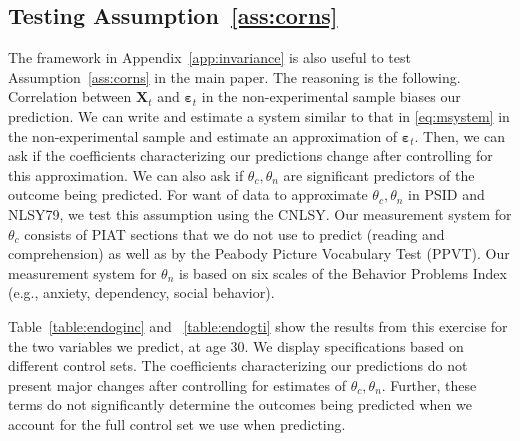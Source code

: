 \subsection{Testing  Assumption~\ref{ass:corns}} \label{app:endogeneity}

\noindent The framework in Appendix~\ref{app:invariance} is also useful to test Assumption~\ref{ass:corns} in the main paper. The reasoning is the following. Correlation between $\bm{X}_{t}$ and $\bm{\varepsilon}_{t}$ in the non-experimental sample biases our prediction. We can write and estimate a system similar to that in \eqref{eq:msystem} in the non-experimental sample and estimate an approximation of $\bm{\varepsilon}_{t}$. Then, we can ask if the coefficients characterizing our predictions change after controlling for this approximation. We can also ask if $\theta_{c}, \theta_{n}$ are significant predictors of the outcome being predicted. For want of data to approximate $\theta_{c}, \theta_{n}$ in PSID and NLSY79, we test this assumption using the CNLSY. Our measurement system for $\theta_{c}$ consists of PIAT sections that we do not use to predict (reading and comprehension) as well as by the Peabody Picture Vocabulary Test (PPVT). Our measurement system for $\theta_{n}$ is based on six scales of the Behavior Problems Index (e.g., anxiety, dependency, social behavior). 

Table~\ref{table:endoginc} and ~\ref{table:endogti} show the results from this exercise for the two variables we predict, at age 30. We display specifications based on different control sets. The coefficients characterizing our predictions do not present major changes after controlling for estimates of $\theta_{c}, \theta_{n}$. Further, these terms do not significantly determine the outcomes being predicted when we account for the full control set we use when predicting.

